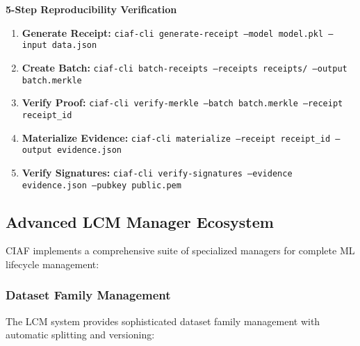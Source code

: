\documentclass[12pt,a4paper]{article}
\begin{document}
\begin{infobox}
\textbf{5-Step Reproducibility Verification}
\begin{enumerate}
\item \textbf{Generate Receipt:} \texttt{ciaf-cli generate-receipt --model model.pkl --input data.json}
\item \textbf{Create Batch:} \texttt{ciaf-cli batch-receipts --receipts receipts/ --output batch.merkle}
\item \textbf{Verify Proof:} \texttt{ciaf-cli verify-merkle --batch batch.merkle --receipt receipt\_id}
\item \textbf{Materialize Evidence:} \texttt{ciaf-cli materialize --receipt receipt\_id --output evidence.json}
\item \textbf{Verify Signatures:} \texttt{ciaf-cli verify-signatures --evidence evidence.json --pubkey public.pem}
\end{enumerate}
\end{infobox}

\subsection{Advanced LCM Manager Ecosystem}

CIAF implements a comprehensive suite of specialized managers for complete ML lifecycle management:

\subsubsection{Dataset Family Management}

The LCM system provides sophisticated dataset family management with automatic splitting and versioning:
\end{document}
